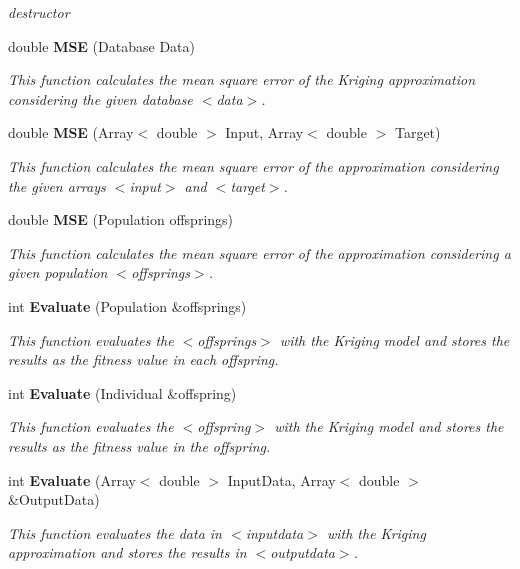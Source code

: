 \begin{CompactItemize}
\begin{CompactList}\small\item\em destructor \item\end{CompactList}\item 
double {\bf MSE} (Database Data)
\begin{CompactList}\small\item\em This function calculates the mean square error of the Kriging approximation considering the given database $<$data$>$. \item\end{CompactList}\item 
double {\bf MSE} (Array$<$ double $>$ Input, Array$<$ double $>$ Target)
\begin{CompactList}\small\item\em This function calculates the mean square error of the approximation considering the given arrays $<$input$>$ and $<$target$>$. \item\end{CompactList}\item 
double {\bf MSE} (Population offsprings)
\begin{CompactList}\small\item\em This function calculates the mean square error of the approximation considering a given population $<$offsprings$>$. \item\end{CompactList}\item 
int {\bf Evaluate} (Population \&offsprings)
\begin{CompactList}\small\item\em This function evaluates the $<$offsprings$>$ with the Kriging model and stores the results as the fitness value in each offspring. \item\end{CompactList}\item 
int {\bf Evaluate} (Individual \&offspring)
\begin{CompactList}\small\item\em This function evaluates the $<$offspring$>$ with the Kriging model and stores the results as the fitness value in the offspring. \item\end{CompactList}\item 
int {\bf Evaluate} (Array$<$ double $>$ Input\-Data, Array$<$ double $>$ \&Output\-Data)
\begin{CompactList}\small\item\em This function evaluates the data in $<$inputdata$>$ with the Kriging approximation and stores the results in $<$outputdata$>$. \item\end{CompactList}\item 

\end{CompactItemize}
